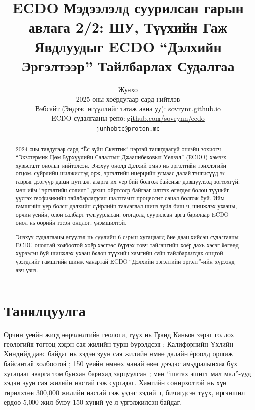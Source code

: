 \documentclass[10pt,twocolumn,letterpaper]{article}
\begin{document}
\title{ECDO Мэдээлэлд суурилсан гарын авлага 2/2: ШУ, Түүхийн Гаж Явдлуудыг ECDO “Дэлхийн Эргэлтээр” Тайлбарлах Судалгаа}

\author{Жунхо\\
2025 оны хоёрдугаар сард нийтлэв\\
Вэбсайт (Эндээс өгүүллийг татаж авна уу): \href{https://sovrynn.github.io}{sovrynn.github.io}\\
ECDO судалгааны репо: \href{https://github.com/sovrynn/ecdo}{github.com/sovrynn/ecdo}\\
{\tt\small junhobtc@proton.me}
}

\maketitle

\begin{abstract}
2024 оны тавдугаар сард “Ёс зүйн Скептик” нэртэй танигдаагүй онлайн зохиогч \cite{0} “Экзотермик Цөм-Бүрхүүлийн Салалтын Джаанибековын Үелзэл” (ECDO) \cite{1} хэмээх хувьсгалт онолыг нийтэлсэн. Энэхүү онолд Дэлхий өмнө нь эргэлтийн тэнхлэгийн огцом, сүйрлийн шилжилтэд орж, эргэлтийн инерцийн улмаас далай тэнгисүүд эх газрыг дээгүүр даван цутгаж, аварга их үер бий болгож байсныг дэвшүүлээд зогсохгүй, мөн ийм “эргэлтийн солилт” дахин ойртсоор байгааг илтгэх өгөгдөл болон түүнийг үүсгэх геофизикийн тайлбарлагдсан шалтгаант процессыг санал болгож буй. Ийм гамшгийн үер болон дэлхийн сүйрлийн таамаглал шинэ зүйл биш ч, шинжлэх ухааны, орчин үеийн, олон салбарт тулгуурласан, өгөгдөлд суурилсан арга барилаар ECDO онол нь өөрийн гэсэн онцлог, үнэмшилтэй.

Энэхүү судалгааны өгүүлэл нь сүүлийн 6 сарын хугацаанд бие даан хийсэн судалгааны \cite{2,20} ECDO онолтай холбоотой хоёр хэсгээс бүрдэх товч тайлангийн хоёр дахь хэсэг бөгөөд хүрээлэн буй шинжлэх ухаан болон түүхийн хамгийн сайн тайлбарлагдах онцгой үзэгдлийг гамшгийн шинж чанартай ECDO “Дэлхийн эргэлтийн эргэлт”-ийн хүрээнд авч үзнэ.

\end{abstract}

\section{Танилцуулга}

Орчин үеийн жигд өөрчлөлтийн геологи, түүх нь Гранд Каньон зэрэг голлох геологийн тогтоц хэдэн сая жилийн турш бүрэлдсэн \cite{143}; Калифорнийн Үхлийн Хөндийд давс байдаг нь хэдэн зуун сая жилийн өмнө далайн ёроолд оршиж байсантай холбоотой \cite{144}; 150 үеийн өмнөх манай өвөг дээдэс амьдралынхаа бүх хугацааг аварга том бунхан барихад зарцуулсан \cite{29,70}; мөн “шатах ашигт малтмал”-ууд хэдэн зуун сая жилийн настай \cite{104} гэж сургадаг. Хамгийн сонирхолтой нь хүн төрөлхтөн 300,000 жилийн настай гэж үздэг хэдий ч, бичигдсэн түүх, иргэншил ердөө 5,000 жил буюу 150 хүний үе л үргэлжилсэн байдаг.
\end{document}
